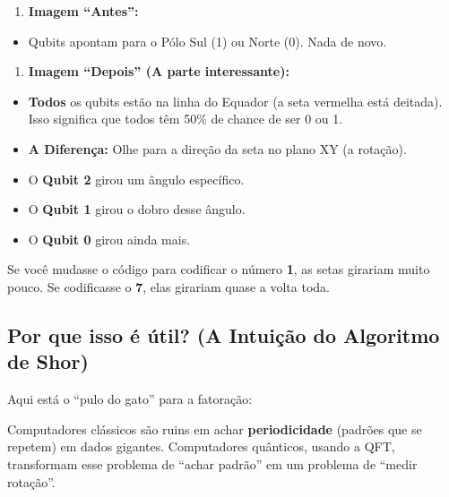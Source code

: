 \documentclass[
  brazilian,
]{report}
\providecommand{\tightlist}{%
  \setlength{\itemsep}{0pt}\setlength{\parskip}{0pt}}
\begin{document}
\begin{enumerate}
\def\labelenumi{\arabic{enumi}.}
\tightlist
\item
  \textbf{Imagem ``Antes'':}
\end{enumerate}

\begin{itemize}
\tightlist
\item
  Qubits apontam para o Pólo Sul (1) ou Norte (0). Nada de novo.
\end{itemize}

\begin{enumerate}
\def\labelenumi{\arabic{enumi}.}
\setcounter{enumi}{1}
\tightlist
\item
  \textbf{Imagem ``Depois'' (A parte interessante):}
\end{enumerate}

\begin{itemize}
\tightlist
\item
  \textbf{Todos} os qubits estão na linha do Equador (a seta vermelha
  está deitada). Isso significa que todos têm 50\% de chance de ser 0 ou
  1.
\item
  \textbf{A Diferença:} Olhe para a direção da seta no plano XY (a
  rotação).
\item
  O \textbf{Qubit 2} girou um ângulo específico.
\item
  O \textbf{Qubit 1} girou o dobro desse ângulo.
\item
  O \textbf{Qubit 0} girou ainda mais.
\end{itemize}

Se você mudasse o código para codificar o número \textbf{1}, as setas
girariam muito pouco. Se codificasse o \textbf{7}, elas girariam quase a
volta toda.

\subsection{Por que isso é útil? (A Intuição do Algoritmo de
Shor)}\label{por-que-isso-uxe9-uxfatil-a-intuiuxe7uxe3o-do-algoritmo-de-shor}

Aqui está o ``pulo do gato'' para a fatoração:

Computadores clássicos são ruins em achar \textbf{periodicidade}
(padrões que se repetem) em dados gigantes. Computadores quânticos,
usando a QFT, transformam esse problema de ``achar padrão'' em um
problema de ``medir rotação''.
\end{document}
